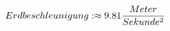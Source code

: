 \documentclass[preview]{standalone}
\begin{document}
\begin{align*}
\special{dvisvgm:raw <g id='unique000'>}Erdbeschleunigung: \approx 9.81 \frac{Meter}{Sekunde^{2}}\special{dvisvgm:raw </g>}
\end{align*}
\end{document}
